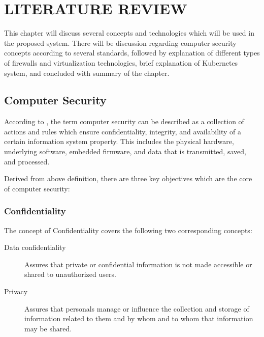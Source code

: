 \documentclass[../index.tex]{subfiles}
\begin{document}
\chapter{LITERATURE REVIEW}

This chapter will discuss several concepts and technologies which will be used in the proposed
system. There will be discussion regarding computer security concepts according to several
standards, followed by explanation of different types of firewalls and virtualization technologies,
brief explanation of Kubernetes system, and concluded with summary of the chapter.


\section{Computer Security}

According to \cite{Paulsen_Byers_2019}, the term computer security can be described as a collection
of actions and rules which ensure confidentiality, integrity, and availability of a certain
information system property. This includes the physical hardware, underlying software, embedded
firmware, and data that is transmitted, saved, and processed.

Derived from above definition, there are three key objectives which are the core of computer
security:

\subsection{Confidentiality}

The concept of Confidentiality covers the following two corresponding concepts:

\begin{description}

  \item[Data confidentiality] Assures that private or confidential information is not made
    accessible or shared to unauthorized users.

  \item[Privacy] Assures that personals manage or influence the collection and storage of
    information related to them and by whom and to whom that information may be shared.

\end{description}
\end{document}
